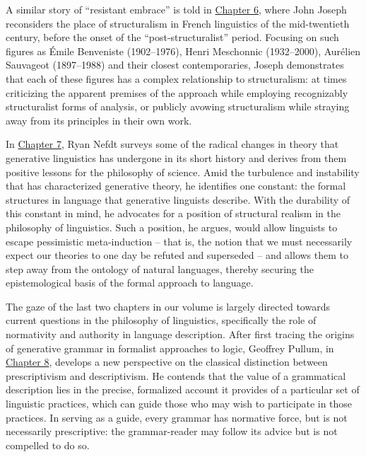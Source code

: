 \documentclass[output=paper]{langscibook}
\begin{document}
A similar story of ``resistant embrace'' is told in \hyperref[chap:joseph]{Chapter 6}, where John Joseph reconsiders the place of structuralism in French linguistics of the mid-twentieth century, before the onset of the ``post-structuralist'' period. Focusing on such figures as Émile Benveniste (1902--1976), Henri Meschonnic (1932--2000), Aurélien Sauvageot (1897--1988) and their closest contemporaries, Joseph demonstrates that each of these figures has a complex relationship to structuralism: at times criticizing the apparent premises of the approach while employing recognizably structuralist forms of analysis, or publicly avowing structuralism while straying away from its principles in their own work.

In \hyperref[chap:nefdt]{Chapter 7}, Ryan Nefdt surveys some of the radical changes in theory that generative linguistics has undergone in its short history and derives from them positive lessons for the philosophy of science. Amid the turbulence and instability that has characterized generative theory, he identifies one constant: the formal structures in language that generative linguists describe. With the durability of this constant in mind, he advocates for a position of structural realism in the philosophy of linguistics. Such a position, he argues, would allow linguists to escape pessimistic meta-induction -- that is, the notion that we must necessarily expect our theories to one day be refuted and superseded -- and allows them to step away from the ontology of natural languages, thereby securing the epistemological basis of the formal approach to language.

The gaze of the last two chapters in our volume is largely directed towards current questions in the philosophy of linguistics, specifically the role of normativity and authority in language description. After first tracing the origins of generative grammar in formalist approaches to logic, Geoffrey Pullum, in \hyperref[chap:pullum]{Chapter 8}, develops a new perspective on the classical distinction between prescriptivism and descriptivism. He contends that the value of a grammatical description lies in the precise, formalized account it provides of a particular set of linguistic practices, which can guide those who may wish to participate in those practices. In serving as a guide, every grammar has normative force, but is not necessarily prescriptive: the grammar-reader may follow its advice but is not compelled to do so.
\end{document}
